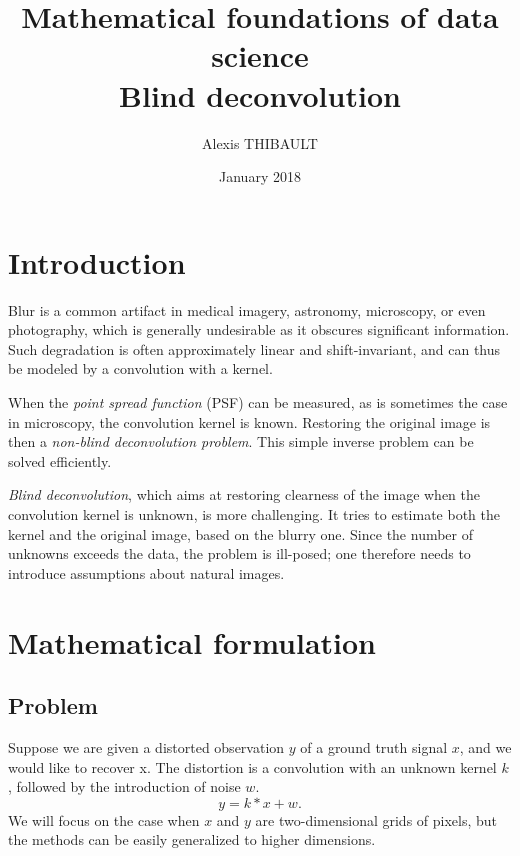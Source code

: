 \documentclass[french,a4paper]{article}
\title{Mathematical foundations of data science\\
Blind deconvolution}
\date{January 2018}
\author{Alexis THIBAULT}
\theoremstyle{plain}
\theoremstyle{definition}
\theoremstyle{remark}
\begin{document}
\maketitle


\section{Introduction}
Blur is a common artifact in medical imagery, astronomy, microscopy, or even photography, which is generally undesirable as it obscures significant information.
Such degradation is often approximately linear and shift-invariant, and can thus be modeled by a convolution with a kernel.

When the \emph{point spread function} (PSF) can be measured, as is sometimes the case in microscopy, the convolution kernel is known.
Restoring the original image is then a \emph{non-blind deconvolution problem}.
This simple inverse problem can be solved efficiently.

\emph{Blind deconvolution}, which aims at restoring clearness of the image when the convolution kernel is unknown, is more challenging.
It tries to estimate both the kernel and the original image, based on the blurry one.
Since the number of unknowns exceeds the data, the problem is ill-posed; one therefore needs to introduce assumptions about natural images.

\section{Mathematical formulation}
\subsection{Problem}
Suppose we are given a distorted observation $y$ of a ground truth signal $x$, and we would like to recover x. The distortion is a convolution with an unknown kernel $k$, followed by the introduction of noise $w$.
\[
y = k * x + w.
\]
We will focus on the case when $x$ and $y$ are two-dimensional grids of pixels, but the methods can be easily generalized to higher dimensions.
\end{document}
